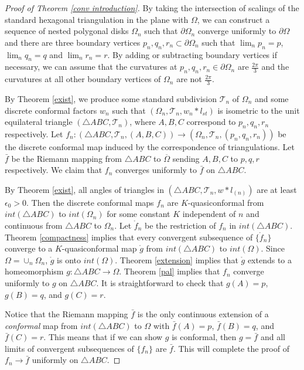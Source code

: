 \documentclass[12pt]{amsart}
\def\T{\mathcal{T}}
\begin{document}
\begin{proof}[Proof of Theorem \ref{conv introduction}]
By taking the intersection of scalings of the standard hexagonal triangulation in the plane with $\Omega$, we can construct a sequence of nested polygonal disks $\Omega_n$ such that $\partial \Omega_n$ converge uniformly to $\partial \Omega$ and there are three boundary vertices $p_n,q_n, r_n \subset
\partial \Omega_n$ such that $\lim_n p_n =p$, $\lim_n q_n =q$ and
$\lim_n r_n =r$. By adding or subtracting boundary vertices if necessary, we can assume that the curvatures at $p_n,
q_n, r_n\in \partial \Omega_n$ are $\frac{2\pi}{3}$ and the curvatures at all
other boundary vertices of $\Omega_n$ are not $\frac{2\pi}{3}$.


By Theorem \ref{exist}, we produce some standard subdivision $\T_n$ of
$\Omega_n$ and some discrete conformal factors $w_n$ such that $(\Omega_n, \T_n,
w_n*l_{st})$ is isometric to the unit equilateral triangle $(\triangle ABC, \T_n)$, where
$A,B,C$ correspond to $p_n,q_n,r_n$ respectively.
Let $f_n: (\triangle ABC,\mathcal{T}_n, (A,B,C)) \to (\Omega_n, \T_n, (p_n, q_n, r_n))$ be the discrete conformal map induced by the correspondence of triangulations.
Let $\bar{f}$ be  the Riemann mapping from $\triangle ABC$ to $\overline{\Omega}$
 sending $A, B, C$ to $p, q, r$ respectively. We claim that $f_n$ converges uniformly to
$\bar{f}$ on $\triangle ABC$. %

By Theorem \ref{exist},  all angles of triangles in  $(\triangle ABC, \T_n, w*l_{(n)})$ are
at least $\epsilon_0>0$.  Then the discrete conformal maps $f_n$ are
$K$-quasiconformal from $int(\triangle ABC)$ to $int(\Omega_n)$ for some constant $K$ independent of $n$ and continuous from $\triangle ABC$ to $\Omega_n$. Let $\mathring{f}_n$ be the restriction of $f_n$ in $int(\triangle ABC)$. Theorem \ref{compactness} implies that every convergent subsequence of $\{\mathring f_n\}$ converge to a $K$-quasiconformal map $\mathring{g}$ from $int(\triangle ABC)$ to $int(\Omega)$. Since $\Omega = \cup_n\Omega_n$, $\mathring{g}$ is onto $int(\Omega)$. Theorem \ref{extension} implies that $\mathring{g}$ extends to a homeomorphism $g:\triangle ABC \to \Omega$. Theorem \ref{pal} implies that $f_n$ converge uniformly to $g$ on $\triangle ABC$. It is straightforward to check that $g(A) = p$, $g(B) = q$, and $g(C) = r$.

Notice that the Riemann mapping $\bar f$ is the only continuous extension of a \textit{conformal} map from $int(\triangle ABC)$ to $\Omega$ with $\bar{f}(A) = p$, $\bar{f}(B) = q$, and $\bar{f}(C) = r$. This means that if we can show $g$ is conformal, then $g = \bar{f}$ and all limits of convergent subsequences of $\{f_n\}$ are $\bar{f}$. This will complete the proof of $f_n\to \bar{f}$ uniformly on $\triangle ABC$.


\end{proof}
\end{document}

